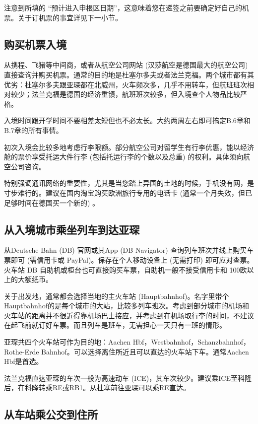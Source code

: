     注意到所填的 “预计进入申根区日期”，这意味着您在递签之前要确定好自己的机票。关于订机票的事宜详见下一小节。

  \subsection{购买机票入境}

    从携程、飞猪等中间商，或者从航空公司网站 (汉莎航空是德国最大的航空公司) 直接查询并购买机票。通常的目的地是杜塞尔多夫或者法兰克福。两个城市都有其优劣：杜塞尔多夫跟亚琛都在北威州，火车频次多，几乎不用转车，但航班班次相对较少；法兰克福是德国的经济重镇，航班班次较多，但入境查个人物品比较严格。

    入境时间跟开学时间不要相差太短但也不必太长。大约两周左右即可搞定B.6章和B.7章的所有事情。

    初次入境会比较多地考虑行李限额。部分航空公司对留学生有行李优惠，能以经济舱的票价享受托运大件行李 (包括托运行李的个数以及总重) 的权利。具体须向航空公司咨询。

    特别强调通讯网络的重要性，尤其是当您踏上异国的土地的时候，手机没有网，是寸步难行的。建议在国内淘宝购买欧洲旅行专用的电话卡 (通常一个月失效，但已足够时间在德国买一个新的) 。

  \subsection{从入境城市乘坐列车到达亚琛}

    从Deutsche Bahn (DB) 官网或其App (DB Navigator) 查询列车班次并线上购买车票即可 (需信用卡或 PayPal)。保存在个人移动设备上 (无需打印) 即可应对查票。火车站 DB 自助机或柜台也可直接购买车票，自助机一般不接受信用卡和 100欧以上的大额纸币。

    关于出发地，通常都会选择当地的主火车站 (Hauptbahnhof)。名字里带个Hauptbahnhof的是每个城市的大站，比较多列车班次。考虑到部分城市的机场和火车站的距离并不很近得靠机场巴士接应，并考虑到在机场取行李的时间，不建议在起飞前就订好车票。而且列车是班车，无需担心一天只有一班的情形。

    亚琛共四个火车站可作为目的地：Aachen Hbf，Westbahnhof，Schanzbahnhof，Rothe-Erde Bahnhof。可以选择离住所近且可以直达的火车站下车。通常Aachen Hbf是首选。

    法兰克福直达亚琛的车次一般为高速动车 (ICE)，其车次较少。建议乘ICE至科隆后，在科隆转乘RE或RB1。从杜塞前往亚琛可以乘RE直达。

  \subsection{从车站乘公交到住所}


